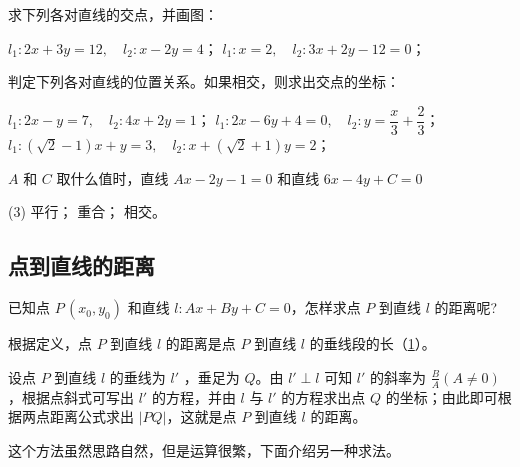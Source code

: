 \begin{Practice}
  \begin{question}
    \item 求下列各对直线的交点，并画图：
    \begin{tasks}
      \task $l_1:2x+3y=12,\quad l_2:x-2y=4$；
      \task $l_1:x=2,\quad l_2:3x+2y-12=0$；
    \end{tasks}
    \item 判定下列各对直线的位置关系。如果相交，则求出交点的坐标：
    \begin{tasks}
      \task $l_1:2x-y=7,\quad l_2:4x+2y=1$；
      \task $l_1:2x-6y+4=0,\quad l_2:y=\dfrac{x}{3}+\dfrac{2}{3}$；
      \task $l_1:(\sqrt{2}-1)x+y=3,\quad l_2:x+(\sqrt{2}+1)y=2$；
    \end{tasks}
    \item $A$ 和 $C$ 取什么值时，直线 $Ax-2y-1=0$ 和直线 $6x-4y+C=0$
    \begin{tasks}(3)
      \task 平行；
      \task 重合；
      \task 相交。
    \end{tasks} 
  \end{question}
\end{Practice}

\subsection{点到直线的距离}
已知点 $P\,(x_0,y_0)$ 和直线 $l:Ax+By+C=0$，怎样求点 $P$ 到直线 $l$ 的距离呢?

根据定义，点 $P$ 到直线 $l$ 的距离是点 $P$ 到直线 $l$ 的垂线段的长（\cref{fig:1-34}）。
\begin{figure}
  \begin{minipage}[b]{0.48\linewidth}\centering
    \subcaption{}\label{fig:1-34a}
  \end{minipage}
  \begin{minipage}[b]{0.48\linewidth}\centering
    \subcaption{}\label{fig:1-34b}
  \end{minipage}
  \caption{}\label{fig:1-34}
\end{figure}

设点 $P$ 到直线 $l$ 的垂线为 $l'$ ，垂足为 $Q$。由 $l'\perp l$ 可知 $l'$ 的斜率为 $\frac{B}{A}(A \neq 0)$，根据点斜式可写出 $l'$ 的方程，并由 $l$ 与 $l'$ 的方程求出点 $Q$ 的坐标；由此即可根据两点距离公式求出 $|PQ|$，这就是点 $P$ 到直线 $l$ 的距离。

这个方法虽然思路自然，但是运算很繁，下面介绍另一种求法。

